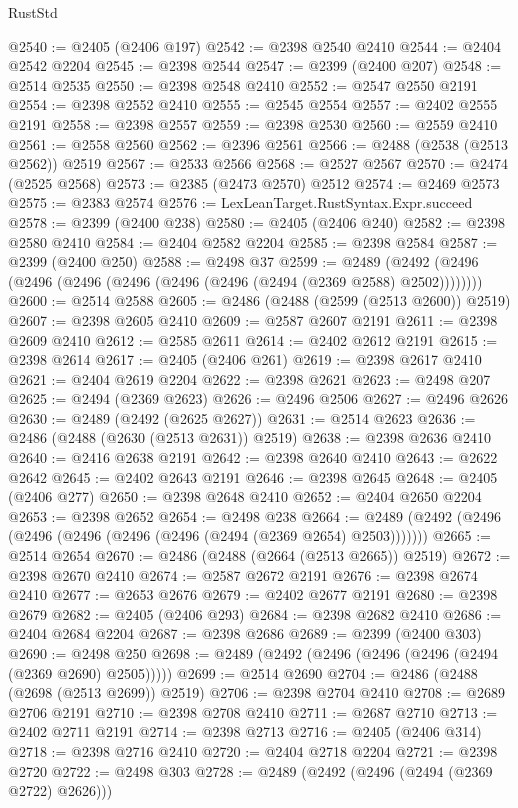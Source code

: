 \begin{lexlean}{RustStd}
\begin{coremodule}
{\begin{coremodule}
{{{{{{{{{{{{{{{{{{{{{{{{{{{{{{{{{{{{{{{{{{{{{{{{{{@2540 := @2405 (@2406 @197)
@2542 := @2398 @2540 @2410
@2544 := @2404 @2542 @2204
@2545 := @2398 @2544
@2547 := @2399 (@2400 @207)
@2548 := @2514 @2535
@2550 := @2398 @2548 @2410
@2552 := @2547 @2550 @2191
@2554 := @2398 @2552 @2410
@2555 := @2545 @2554
@2557 := @2402 @2555 @2191
@2558 := @2398 @2557
@2559 := @2398 @2530
@2560 := @2559 @2410
@2561 := @2558 @2560
@2562 := @2396 @2561
@2566 := @2488 (@2538 (@2513 @2562)) @2519
@2567 := @2533 @2566
@2568 := @2527 @2567
@2570 := @2474 (@2525 @2568)
@2573 := @2385 (@2473 @2570) @2512
@2574 := @2469 @2573
@2575 := @2383 @2574
@2576 := LexLeanTarget.RustSyntax.Expr.succeed
@2578 := @2399 (@2400 @238)
@2580 := @2405 (@2406 @240)
@2582 := @2398 @2580 @2410
@2584 := @2404 @2582 @2204
@2585 := @2398 @2584
@2587 := @2399 (@2400 @250)
@2588 := @2498 @37
@2599 := @2489 (@2492 (@2496 (@2496 (@2496 (@2496 (@2496 (@2496 (@2494 (@2369 @2588) @2502))))))))
@2600 := @2514 @2588
@2605 := @2486 (@2488 (@2599 (@2513 @2600)) @2519)
@2607 := @2398 @2605 @2410
@2609 := @2587 @2607 @2191
@2611 := @2398 @2609 @2410
@2612 := @2585 @2611
@2614 := @2402 @2612 @2191
@2615 := @2398 @2614
@2617 := @2405 (@2406 @261)
@2619 := @2398 @2617 @2410
@2621 := @2404 @2619 @2204
@2622 := @2398 @2621
@2623 := @2498 @207
@2625 := @2494 (@2369 @2623)
@2626 := @2496 @2506
@2627 := @2496 @2626
@2630 := @2489 (@2492 (@2625 @2627))
@2631 := @2514 @2623
@2636 := @2486 (@2488 (@2630 (@2513 @2631)) @2519)
@2638 := @2398 @2636 @2410
@2640 := @2416 @2638 @2191
@2642 := @2398 @2640 @2410
@2643 := @2622 @2642
@2645 := @2402 @2643 @2191
@2646 := @2398 @2645
@2648 := @2405 (@2406 @277)
@2650 := @2398 @2648 @2410
@2652 := @2404 @2650 @2204
@2653 := @2398 @2652
@2654 := @2498 @238
@2664 := @2489 (@2492 (@2496 (@2496 (@2496 (@2496 (@2496 (@2494 (@2369 @2654) @2503)))))))
@2665 := @2514 @2654
@2670 := @2486 (@2488 (@2664 (@2513 @2665)) @2519)
@2672 := @2398 @2670 @2410
@2674 := @2587 @2672 @2191
@2676 := @2398 @2674 @2410
@2677 := @2653 @2676
@2679 := @2402 @2677 @2191
@2680 := @2398 @2679
@2682 := @2405 (@2406 @293)
@2684 := @2398 @2682 @2410
@2686 := @2404 @2684 @2204
@2687 := @2398 @2686
@2689 := @2399 (@2400 @303)
@2690 := @2498 @250
@2698 := @2489 (@2492 (@2496 (@2496 (@2496 (@2494 (@2369 @2690) @2505)))))
@2699 := @2514 @2690
@2704 := @2486 (@2488 (@2698 (@2513 @2699)) @2519)
@2706 := @2398 @2704 @2410
@2708 := @2689 @2706 @2191
@2710 := @2398 @2708 @2410
@2711 := @2687 @2710
@2713 := @2402 @2711 @2191
@2714 := @2398 @2713
@2716 := @2405 (@2406 @314)
@2718 := @2398 @2716 @2410
@2720 := @2404 @2718 @2204
@2721 := @2398 @2720
@2722 := @2498 @303
@2728 := @2489 (@2492 (@2496 (@2494 (@2369 @2722) @2626)))
}}}}}}}}}}}}}}}}}}}}}}}}}}}}}}}}}}}}}}}}}}}}}}}}}}
\end{coremodule}}
\end{coremodule}
\end{lexlean}
